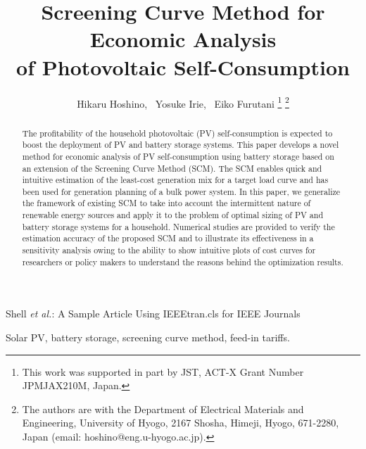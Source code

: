\documentclass[lettersize,journal]{IEEEtran}
\begin{document}
\title{Screening Curve Method for Economic Analysis \\of Photovoltaic Self-Consumption}

\author{Hikaru Hoshino,~
        Yosuke Irie,~
        Eiko Furutani
\thanks{This work was supported in part by JST, ACT-X Grant Number JPMJAX210M, Japan.}%
\thanks{The authors are with the Department of Electrical Materials and Engineering, University of Hyogo, 2167 Shosha, Himeji, Hyogo, 671-2280, Japan (email: hoshino@eng.u-hyogo.ac.jp). }%
}

\markboth{}%
{Shell \MakeLowercase{\textit{et al.}}: A Sample Article Using IEEEtran.cls for IEEE Journals}

\IEEEpubid{}

\maketitle

\begin{abstract}
The profitability of the household photovoltaic (PV) self-consumption is expected to boost the deployment of PV and battery storage systems. This paper develops a novel method for economic analysis of PV self-consumption using battery storage based on an extension of the Screening Curve Method (SCM). The SCM enables quick and intuitive estimation of the least-cost generation mix for a target load curve and has been used for generation planning of a bulk power system. In this paper, we generalize the framework of existing SCM to take into account the intermittent nature of renewable energy sources and apply it to the problem of optimal sizing of PV and battery storage systems for a household. Numerical studies are provided to verify the estimation accuracy of the proposed SCM and to illustrate its effectiveness in a sensitivity analysis owing to the ability to show intuitive plots of cost curves for researchers or policy makers to understand the reasons behind the optimization results. 
\end{abstract}

\begin{IEEEkeywords}
 Solar PV, battery storage, screening curve method, feed-in tariffs.
\end{IEEEkeywords}
\end{document}
